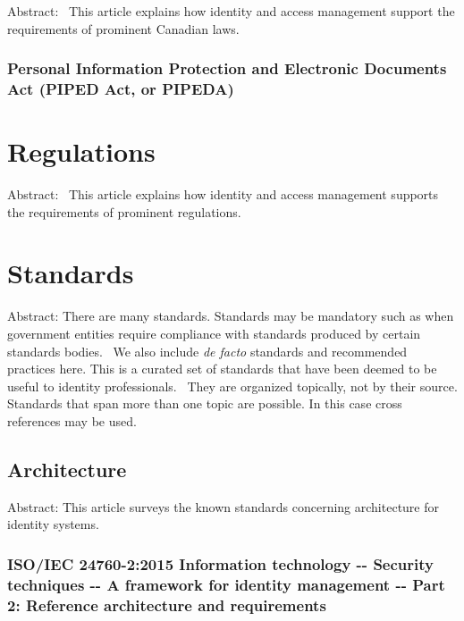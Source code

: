 Abstract:~ This article explains how identity and access management
support the requirements of prominent Canadian laws.

\hypertarget{personal-information-protection-and-electronic-documents-act-piped-act-or-pipeda}{%
\subsubsection{Personal Information Protection and Electronic Documents Act
(PIPED Act, or
PIPEDA)}\label{personal-information-protection-and-electronic-documents-act-piped-act-or-pipeda}}

\hypertarget{regulations}{%
\section{Regulations}\label{regulations}}

Abstract:~ This article explains how identity and access management
supports the requirements of prominent regulations.

\hypertarget{standards}{%
\section{Standards}\label{standards}}

Abstract: There are many standards. Standards may be mandatory such as
when government entities require compliance with standards produced by
certain standards bodies.~ We also include \emph{de facto} standards and
recommended practices here. This is a curated set of standards that have
been deemed to be useful to identity professionals.~ They are organized
topically, not by their source. Standards that span more than one topic
are possible. In this case cross references may be used.

\hypertarget{architecture}{%
\subsection{Architecture}\label{architecture}}

Abstract: This article surveys the known standards concerning
architecture for identity systems.

\hypertarget{isoiec-24760-22015-information-technology----security-techniques----a-framework-for-identity-management----part-2-reference-architecture-and-requirements}{%
\subsubsection{ISO/IEC 24760-2:2015 Information technology -\/- Security
techniques -\/- A framework for identity management -\/- Part 2:
Reference architecture and
requirements}\label{isoiec-24760-22015-information-technology----security-techniques----a-framework-for-identity-management----part-2-reference-architecture-and-requirements}}

